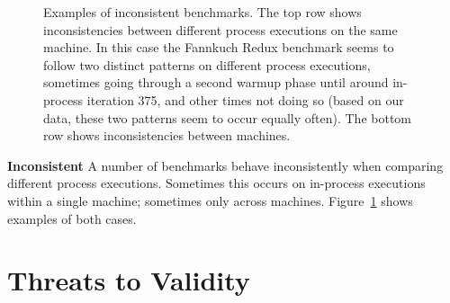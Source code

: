 \documentclass[a4paper,UKenglish]{lipics}
\begin{document}
\begin{figure}[t!]
\makebox[\textwidth][c]{~}  %
\caption{Examples of inconsistent benchmarks.
The top row shows inconsistencies between different process
executions on the same machine. In this case the Fannkuch Redux benchmark
seems to follow two distinct patterns on different process executions,
sometimes going through a second warmup phase until around in-process iteration 375, and
other times not doing so (based on our data, these two patterns seem to occur
equally often). The bottom row shows inconsistencies between
machines.}
\label{fig:examples:inconsistent}
\end{figure}

\textbf{Inconsistent} \label{sub:inconsistent}
A number of benchmarks behave inconsistently when comparing different process executions. Sometimes this occurs on
in-process executions within a single machine; sometimes only across machines.
Figure~\ref{fig:examples:inconsistent} shows examples of both cases.


\section{Threats to Validity}
\label{sec:threats}
\end{document}
